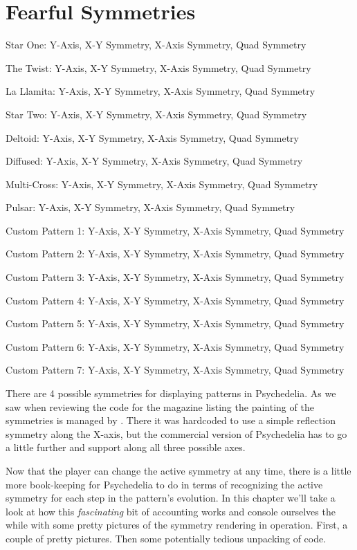 \chapter{Fearful Symmetries} 
\lstset{style=6502Style}

\newcommand\addItem[2]%
{
  \expandafter\def\csname row:#1\endcsname{#2}%
}

\newcommand\showItem[1]%
{\expandafter\csname row:#1\endcsname}


\newcommand\getItem[1]%
{\noindent
  \text{\showItem{#1}}
  \par
}
\addItem{0}{Star One: Y-Axis, X-Y Symmetry, X-Axis Symmetry, Quad Symmetry}
\addItem{1}{The Twist: Y-Axis, X-Y Symmetry, X-Axis Symmetry, Quad Symmetry}
\addItem{2}{La Llamita: Y-Axis, X-Y Symmetry, X-Axis Symmetry, Quad Symmetry}
\addItem{3}{Star Two: Y-Axis, X-Y Symmetry, X-Axis Symmetry, Quad Symmetry}
\addItem{4}{Deltoid: Y-Axis, X-Y Symmetry, X-Axis Symmetry, Quad Symmetry}
\addItem{5}{Diffused: Y-Axis, X-Y Symmetry, X-Axis Symmetry, Quad Symmetry}
\addItem{6}{Multi-Cross: Y-Axis, X-Y Symmetry, X-Axis Symmetry, Quad Symmetry}
\addItem{7}{Pulsar: Y-Axis, X-Y Symmetry, X-Axis Symmetry, Quad Symmetry}
\addItem{8}{Custom Pattern 1: Y-Axis, X-Y Symmetry, X-Axis Symmetry, Quad Symmetry}
\addItem{9}{Custom Pattern 2: Y-Axis, X-Y Symmetry, X-Axis Symmetry, Quad Symmetry}
\addItem{10}{Custom Pattern 3: Y-Axis, X-Y Symmetry, X-Axis Symmetry, Quad Symmetry}
\addItem{11}{Custom Pattern 4: Y-Axis, X-Y Symmetry, X-Axis Symmetry, Quad Symmetry}
\addItem{12}{Custom Pattern 5: Y-Axis, X-Y Symmetry, X-Axis Symmetry, Quad Symmetry}
\addItem{13}{Custom Pattern 6: Y-Axis, X-Y Symmetry, X-Axis Symmetry, Quad Symmetry}
\addItem{14}{Custom Pattern 7: Y-Axis, X-Y Symmetry, X-Axis Symmetry, Quad Symmetry}

There are 4 possible symmetries for displaying patterns in Psychedelia. As we saw when
reviewing the code for the magazine listing the painting of the symmetries is managed
by . There it was hardcoded to use a simple
reflection symmetry along the X-axis, but the commercial version of Psychedelia has to
go a little further and support along all three possible axes. 

Now that the player can change the active symmetry at any time, there is a little more
book-keeping for Psychedelia to do in terms of recognizing the active symmetry for each
step in the pattern's evolution. In this chapter we'll take a look at how this 
\textit{fascinating} bit of accounting works and console ourselves the while with some
pretty pictures of the symmetry rendering in operation. First, a couple of pretty pictures.
Then some potentially tedious unpacking of code.

